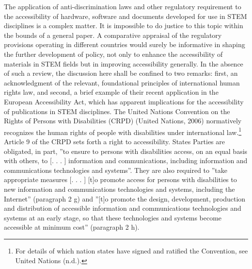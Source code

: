 \documentclass{sig-alternate} %
\begin{document}
\begin{large}
The application of anti-discrimination laws and other regulatory requirement to the accessibility of hardware, software and documents developed for use in STEM disciplines is a complex matter. It is impossible to do justice to this topic within the bounds of a general paper. A comparative appraisal of the regulatory provisions operating in different countries would surely be informative in shaping the further development of policy, not only to enhance the accessibility of materials in STEM fields but in improving accessibility generally. In the absence of such a review, the discussion here shall be confined to two remarks: first, an acknowledgment of the relevant, foundational principles of international human rights law, and second, a brief example of their recent application in the European Accessibility Act, which has apparent implications for the accessibility of publications in STEM disciplines. The United Nations Convention on the Rights of Persons with Disabilities (CRPD) (United Nations, 2006) normatively recognizes the human rights of people with disabilities under international law.\footnote{For details of which nation states have signed and ratified the Convention, see United Nations (n.d.).} Article 9 of the CRPD sets forth a right to accessibility. States Parties are obligated, in part, ”to ensure to persons with disabilities access, on an equal basis with others, to [. . . ] information and communications, including information and communications technologies and systems”. They are also required to ”take appropriate measures [. . . ] [t]o promote access for persons with disabilities to new information and communications technologies and systems, including the Internet” (paragraph 2 g) and ”[t]o promote the design, development, production and distribution of accessible information and communications technologies and systems at an early stage, so that these technologies and systems become accessible at minimum cost” (paragraph 2 h).


\end{large}
\end{document}
